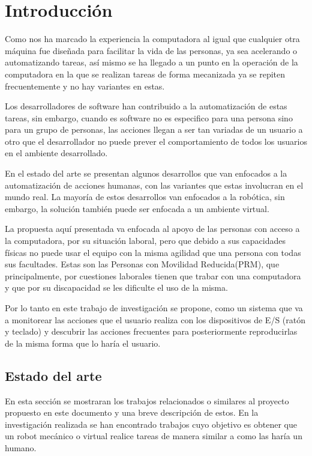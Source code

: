 \chapter{Introducción \label{cap1}}

Como nos ha marcado la experiencia la computadora al igual que cualquier otra
 máquina fue diseñada para facilitar la vida de las personas, ya sea acelerando
 o automatizando tareas, así mismo se ha llegado a un punto en la operación de
 la computadora en la que se realizan tareas de forma mecanizada ya se repiten
 frecuentemente y no hay variantes en estas.  

Los desarrolladores de software han contribuido a la automatización de estas
 tareas, sin embargo, cuando es software no es especifico para una persona sino
 para un grupo de personas, las acciones llegan a ser tan variadas de un usuario
 a otro que el desarrollador no puede prever el comportamiento de todos los
 usuarios en el ambiente desarrollado. 

En el estado del arte se presentan algunos desarrollos que van enfocados a la
 automatización de acciones humanas, con las variantes que estas involucran en
 el mundo real. La mayoría de estos desarrollos van enfocados a la robótica,
 sin embargo, la solución también puede ser enfocada a un ambiente virtual.  

La propuesta aquí presentada va enfocada al apoyo de las personas con acceso a
 la computadora, por su situación laboral, pero que debido a sus capacidades
 físicas no puede usar el equipo con la misma agilidad que una persona con
 todas sus facultades. Estas son las Personas con Movilidad Reducida(PRM), que
 principalmente, por cuestiones laborales tienen que trabar con una computadora
 y que por su discapacidad se les dificulte el uso de la misma.

Por lo tanto en este trabajo de investigación se propone, como un sistema que
 va a monitorear las acciones que el usuario realiza con los dispositivos de
 E/S (ratón y teclado) y  descubrir las acciones frecuentes para posteriormente
 reproducirlas de la misma forma que lo haría el usuario.

\section{Estado del arte}
En esta sección se mostraran los trabajos relacionados o similares al proyecto
 propuesto en este documento y una breve descripción de estos. En la
 investigación realizada se han encontrado trabajos cuyo objetivo es obtener
 que un robot mecánico o virtual realice tareas de manera similar a como las
 haría un humano. 


